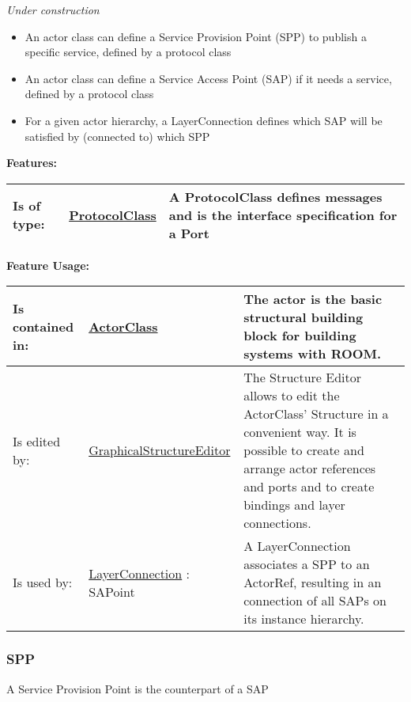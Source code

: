 	\emph{\large Under construction}
	\begin{itemize}
	\item An actor class can define a Service Provision Point (SPP) to publish a specific service, defined by a protocol class
	\item An actor class can define a Service Access Point (SAP) if it needs a service, defined by a protocol class
	\item For a given actor hierarchy, a LayerConnection defines which SAP will be satisfied by (connected to) which SPP
	\end{itemize}
		
		
	\begingroup
	\textbf{Features:}
	\renewcommand{\arraystretch}{1.8} %
	\begin{longtable}{l|l p{}}
		\hline
	Is of type: & \tabitem \hyperlink{ref:ProtocolClass}{ProtocolClass}  & A ProtocolClass defines messages and is the interface specification for a Port\\
	\hline
	\end{longtable}
	\endgroup
		
	\begingroup
	\textbf{Feature Usage:}
	\renewcommand{\arraystretch}{1.8} %
	\begin{longtable}{l|l p{}}
		\hline
	Is contained in: & \tabitem \hyperlink{ref:ActorClass}{ActorClass}  & The actor is the basic structural building block for building systems with ROOM.\\
	\hline
	Is edited by: & \tabitem \hyperlink{ref:GraphicalStructureEditor}{GraphicalStructureEditor}  & The Structure Editor allows to edit the ActorClass' Structure in a convenient way. It is possible to create and arrange actor references and ports and to create bindings and layer connections.\\
	\hline
	Is used by: & \tabitem \hyperlink{ref:LayerConnection}{LayerConnection} : SAPoint & A LayerConnection associates a SPP to an ActorRef, resulting in an connection of all SAPs on its instance hierarchy.\\
	\hline
	\end{longtable}
	\endgroup
		
	
	\vspace{\baselineskip}
	\vspace{\baselineskip}
	\vspace{\baselineskip}
	
\subsubsection{SPP}
	\hypertarget{ref:SPP}{}
	A Service Provision Point is the counterpart of a SAP
		
